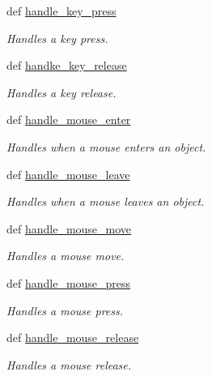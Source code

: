 \begin{DoxyCompactItemize}
\item 
def \hyperlink{classcs110graphics_1_1EventHandler_af3fb3531d0b23f1430a830586cd07906}{handle\_\-key\_\-press}
\begin{DoxyCompactList}\small\item\em Handles a key press. \item\end{DoxyCompactList}\item 
def \hyperlink{classcs110graphics_1_1EventHandler_a6f5269e8062aaee8918560c637383c6e}{handke\_\-key\_\-release}
\begin{DoxyCompactList}\small\item\em Handles a key release. \item\end{DoxyCompactList}\item 
def \hyperlink{classcs110graphics_1_1EventHandler_a13af3268f8a1aa36b8483eb2deffef15}{handle\_\-mouse\_\-enter}
\begin{DoxyCompactList}\small\item\em Handles when a mouse enters an object. \item\end{DoxyCompactList}\item 
def \hyperlink{classcs110graphics_1_1EventHandler_a5deaf2b6b8055e97ac0ddf6603132c64}{handle\_\-mouse\_\-leave}
\begin{DoxyCompactList}\small\item\em Handles when a mouse leaves an object. \item\end{DoxyCompactList}\item 
def \hyperlink{classcs110graphics_1_1EventHandler_a521fdcd170d15c0b8baa124c78b6d1ef}{handle\_\-mouse\_\-move}
\begin{DoxyCompactList}\small\item\em Handles a mouse move. \item\end{DoxyCompactList}\item 
def \hyperlink{classcs110graphics_1_1EventHandler_a547873123ebcd3fcc63a2e03d2a2fee3}{handle\_\-mouse\_\-press}
\begin{DoxyCompactList}\small\item\em Handles a mouse press. \item\end{DoxyCompactList}\item 
def \hyperlink{classcs110graphics_1_1EventHandler_a320a7dbf68d37e0101b237bff1713088}{handle\_\-mouse\_\-release}
\begin{DoxyCompactList}\small\item\em Handles a mouse release. \item\end{DoxyCompactList}\end{DoxyCompactItemize}


